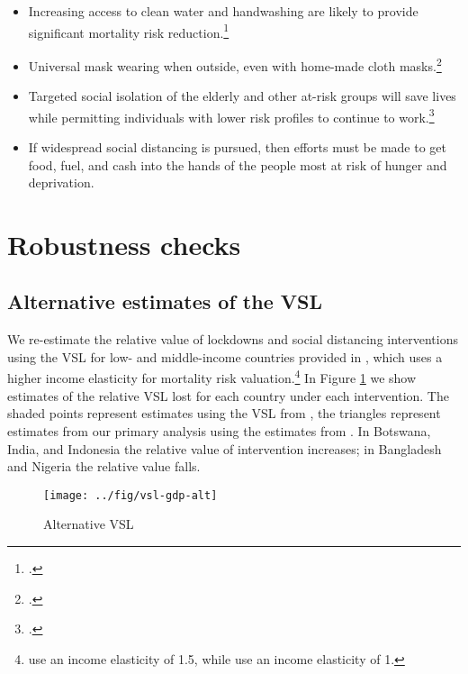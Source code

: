 \documentclass[11pt]{article}
\begin{document}
\begin{itemize}
    \item Increasing access to clean water and handwashing are likely to provide significant mortality risk reduction.\footcite{glassman2020}
    \item Universal mask wearing when outside, even with home-made cloth masks.\footcite{abaluck2020}
    \item Targeted social isolation of the elderly and other at-risk groups will save lives while permitting individuals with lower risk profiles to continue to work.\footcite{lshtm2020, favas2020}
    \item If widespread social distancing is pursued, then efforts must be made to get food, fuel, and cash into the hands of the people most at risk of hunger and deprivation.
\end{itemize}

\clearpage

\appendix

\section{Robustness checks}

\subsection{Alternative estimates of the VSL}
\label{sec:alt-vsl}

We re-estimate the relative value of lockdowns and social distancing interventions using the VSL for low- and middle-income countries provided in \textcite{robinson2019}, which uses a higher income elasticity for mortality risk valuation.\footnote{\textcite{robinson2019} use an income elasticity of 1.5, while \textcite{viscusi2017} use an income elasticity of 1.} In Figure \ref{fig:vsl-gdp-alt} we show estimates of the relative VSL lost for each country under each intervention. The shaded points represent estimates using the VSL from \textcite{robinson2019}, the triangles represent estimates from our primary analysis using the estimates from \textcite{viscusi2017}. In Botswana, India, and Indonesia the relative value of intervention increases; in Bangladesh and Nigeria the relative value falls. 


\begin{figure}[htbp!]
\centering
\caption{Alternative VSL}
\texttt{[image: ../fig/vsl-gdp-alt]}
\label{fig:vsl-gdp-alt}
\end{figure}
\end{document}

